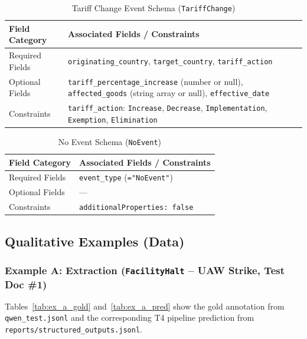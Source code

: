 \documentclass[11pt,a4paper]{article}
\begin{document}
\begin{table}[htbp]
\centering
\caption{Tariff Change Event Schema (\texttt{TariffChange})}
\label{tab:schema_tariff_change}
\begin{tabular}{@{}p{3.0cm} p{9.5cm}@{}}
\toprule
\textbf{Field Category} & \textbf{Associated Fields / Constraints} \\
\midrule
Required Fields & \texttt{originating\_country}, \texttt{target\_country}, \texttt{tariff\_action} \\
Optional Fields & \texttt{tariff\_percentage\_increase} (number or null), \texttt{affected\_goods} (string array or null), \texttt{effective\_date} \\
Constraints & \texttt{tariff\_action}: \texttt{Increase}, \texttt{Decrease}, \texttt{Implementation}, \texttt{Exemption}, \texttt{Elimination} \\
\bottomrule
\end{tabular}
\end{table}

\begin{table}[htbp]
\centering
\caption{No Event Schema (\texttt{NoEvent})}
\label{tab:schema_no_event}
\begin{tabular}{@{}p{3.0cm} p{9.5cm}@{}}
\toprule
\textbf{Field Category} & \textbf{Associated Fields / Constraints} \\
\midrule
Required Fields & \texttt{event\_type} (\texttt{="NoEvent"}) \\
Optional Fields & --- \\
Constraints & \texttt{additionalProperties: false} \\
\bottomrule
\end{tabular}
\end{table}

\clearpage
\subsection{Qualitative Examples (Data)}

\subsubsection*{Example A: Extraction (\texttt{FacilityHalt} -- UAW Strike, Test Doc \#1)}
Tables~\ref{tab:ex_a_gold} and~\ref{tab:ex_a_pred} show the gold annotation from \texttt{qwen\_test.jsonl} and the corresponding T4 pipeline prediction from \texttt{reports/structured\_outputs.jsonl}.
\end{document}
